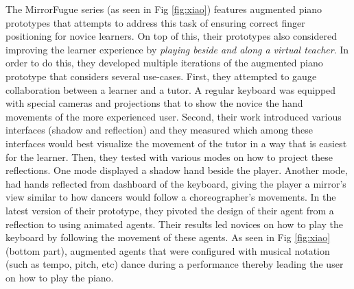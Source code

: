 \documentclass[sigconf, screen, review]{acmart}
\begin{document}
The MirrorFugue series \cite{xiao2010mirrorfugue, xiao2011duet, xiao2013mirrorfugue, xiao2014andante} (as seen in Fig \ref{fig:xiao}) features augmented piano prototypes that attempts to address this task of ensuring correct finger positioning for novice learners.  On top of this, their prototypes also considered improving the learner experience by \textit{playing beside and along a virtual teacher}. In order to do this, they developed multiple iterations of the augmented piano prototype that considers several use-cases. First, they attempted to gauge collaboration between a learner and a tutor. A regular keyboard was equipped with special cameras and projections that to show the novice the hand movements of the more experienced user. Second, their work introduced various interfaces (shadow and reflection) and they measured which among these interfaces would best visualize the movement of the tutor in a way that is easiest for the learner. Then, they tested with various modes on how to project these reflections. One mode displayed a shadow hand beside the player. Another mode, had hands reflected from dashboard of the keyboard, giving the player a mirror's view similar to how dancers would follow a choreographer's movements. In the latest version of their prototype, they pivoted the design of their agent from a reflection to using animated agents. Their results led novices on how to play the keyboard by following the movement of these agents. As seen in Fig \ref{fig:xiao} (bottom part), augmented agents that were configured with musical notation (such as tempo, pitch, etc) dance during a performance thereby leading the user on how to play the piano. 
\end{document}
